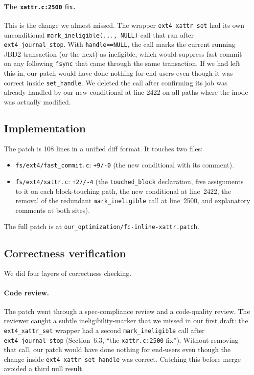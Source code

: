 \documentclass[11pt,a4paper]{article}
\begin{document}
\paragraph{The \texttt{xattr.c:2500} fix.} This is the change we
almost missed. The wrapper \texttt{ext4\_xattr\_set} had its own
unconditional \texttt{mark\_ineligible(..., NULL)} call that ran
after \texttt{ext4\_journal\_stop}. With \texttt{handle==NULL}, the
call marks the current running JBD2 transaction (or the next) as
ineligible, which would suppress fast commit on any following
\texttt{fsync} that came through the same transaction. If we had
left this in, our patch would have done nothing for end-users even
though it was correct inside \texttt{set\_handle}. We deleted the
call after confirming its job was already handled by our new
conditional at line 2422 on all paths where the inode was actually
modified.

\subsection{Implementation}

The patch is 108 lines in a unified diff format. It touches two
files:
\begin{itemize}[leftmargin=*]
  \item \texttt{fs/ext4/fast\_commit.c}: \texttt{+9/-0} (the new
        conditional with its comment).
  \item \texttt{fs/ext4/xattr.c}: \texttt{+27/-4} (the
        \texttt{touched\_block} declaration, five assignments to
        it on each block-touching path, the new conditional at
        line~2422, the removal of the redundant
        \texttt{mark\_ineligible} call at line~2500, and
        explanatory comments at both sites).
\end{itemize}

The full patch is at
\texttt{our\_optimization/fc-inline-xattr.patch}.

\subsection{Correctness verification}

We did four layers of correctness checking.

\paragraph{Code review.} The patch went through a spec-compliance
review and a code-quality review. The reviewer caught a subtle
ineligibility-marker that we missed in our first draft: the
\texttt{ext4\_xattr\_set} wrapper had a second
\texttt{mark\_ineligible} call after \texttt{ext4\_journal\_stop}
(Section~6.3, ``the \texttt{xattr.c:2500} fix''). Without removing
that call, our patch would have done nothing for end-users even
though the change inside \texttt{ext4\_xattr\_set\_handle} was
correct. Catching this before merge avoided a third null result.
\end{document}
